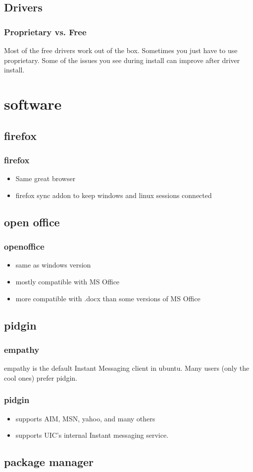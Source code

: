 \documentclass[hyperref={pdfpagelabels=false}]{beamer}
\begin{document}
\subsection{Drivers}
\frame
{
	\frametitle{Proprietary vs. Free}
	Most of the free drivers work out of the box. Sometimes you just have to
use proprietary. Some of the issues you see during install can improve after driver install.
}
\section{software}
\subsection{firefox}
\frame
{
    \frametitle{firefox}
    \begin{itemize}
    \item{Same great browser}
    \item{firefox sync addon to keep windows and linux sessions connected}
    \end{itemize}
}
\subsection{open office}
\frame
{
    \frametitle{openoffice}
    \begin{itemize}
    \item{same as windows version}
    \item{mostly compatible with MS Office}
    \item{more compatible with .docx than some versions of MS Office}
    \end{itemize}
}
\subsection{pidgin}
\frame
{
	\frametitle{empathy}
	empathy is the default Instant Messaging client in ubuntu.
        Many users (only the cool ones) prefer pidgin.
}
\frame
{
	\frametitle{pidgin}
	\begin{itemize}
	\item{supports AIM, MSN, yahoo, and many others}
	\item{supports UIC's internal Instant messaging service.}
	\end{itemize}
}
\subsection{package manager}
\frame
{
	\frametitle{ }


}
\end{document}
